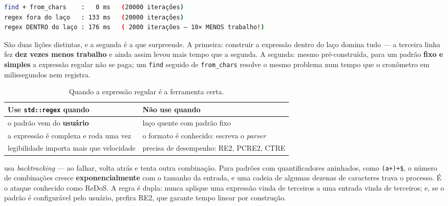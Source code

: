 \begin{lstlisting}[style=bt, language=bash,
    caption={Saída de \texttt{src/strings/}: o mesmo campo, três formas.}]
find + from_chars    :   0 ms   (20000 iterações)
regex fora do laço   : 133 ms   (20000 iterações)
regex DENTRO do laço : 176 ms   ( 2000 iterações — 10× MENOS trabalho!)
\end{lstlisting}

São duas lições distintas, e a segunda é a que surpreende. A primeira: construir
a expressão dentro do laço domina tudo --- a terceira linha fez \textbf{dez
vezes menos trabalho} e ainda assim levou mais tempo que a segunda. A segunda:
mesmo pré-construída, para um padrão \textbf{fixo e simples} a expressão regular
não se paga; um \texttt{find} seguido de \texttt{from\_chars} resolve o mesmo
problema num tempo que o cronômetro em milissegundos nem registra.

\begin{table}[htbp]
\centering
\caption{Quando a expressão regular é a ferramenta certa.}
\label{tab:regex-quando}
\footnotesize
\begin{tabular}{@{}ll@{}}
\toprule
\textbf{Use \texttt{std::regex} quando} & \textbf{Não use quando} \\
\midrule
o padrão vem do \textbf{usuário}      & laço quente com padrão fixo \\
a expressão é complexa e roda uma vez & o formato é conhecido: escreva o \emph{parser} \\
legibilidade importa mais que velocidade & precisa de desempenho: RE2, PCRE2, CTRE \\
\bottomrule
\end{tabular}
\end{table}

\begin{armadilha}
 usa \emph{backtracking} --- ao falhar, volta atrás e tenta
outra combinação. Para padrões com quantificadores aninhados, como
\texttt{(a+)+\$}, o número de combinações cresce \textbf{exponencialmente} com o
tamanho da entrada, e uma cadeia de algumas dezenas de caracteres trava o
processo. É o ataque conhecido como ReDoS. A regra é dupla: nunca aplique uma
expressão vinda de terceiros a uma entrada vinda de terceiros; e, se o padrão é
configurável pelo usuário, prefira RE2, que garante tempo linear por construção.
\end{armadilha}


